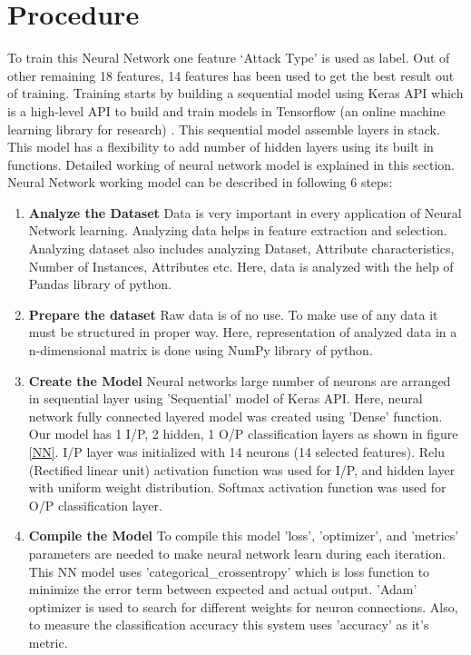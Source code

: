 \section{Procedure} \label{Procedure}
 To train this Neural Network one feature ‘Attack Type’ is used as label. Out of other remaining 18 features, 14 features has been used to get the best result out of training. Training starts by building a sequential model using Keras API which is a high-level API to build and train models in Tensorflow (an online machine learning library for research) . This sequential model assemble layers in stack. This model has a flexibility to add number of hidden layers using its built in functions. Detailed working of neural network model is explained in this section.
Neural Network working model can be described in following 6 steps:
\begin{enumerate}[label=\textbf{\roman*}.]
\item \textbf{Analyze the Dataset } Data is very important in every application of Neural Network learning. Analyzing data helps in feature extraction and selection. Analyzing dataset also includes analyzing Dataset, Attribute characteristics, Number of Instances, Attributes etc. Here, data is analyzed with the help of Pandas library of python. 
\item \textbf{Prepare the dataset } Raw data is of no use. To make use of any data it must be structured in proper way. Here, representation of analyzed data in a n-dimensional matrix is done using NumPy library of python.

\item \textbf{Create the Model } Neural networks large number of neurons are arranged in sequential layer using 'Sequential' model of Keras API. Here, neural network fully connected layered model was created using 'Dense' function. Our model has 1 I/P, 2 hidden, 1 O/P classification layers as shown in figure \ref{NN}. I/P layer was initialized with 14 neurons (14 selected features). Relu (Rectified linear unit) activation function was used for I/P, and hidden layer with uniform weight distribution. Softmax activation function was used for O/P classification layer.

\item \textbf{Compile the Model } To compile this model 'loss', 'optimizer', and 'metrics' parameters are needed to make neural network learn during each iteration. This NN model uses 'categorical\_crossentropy' which is loss function to minimize the error term between expected and actual output. 'Adam' optimizer is used to search for different weights for neuron connections. Also, to measure the classification accuracy this system uses 'accuracy' as it's metric. 


\end{enumerate}
